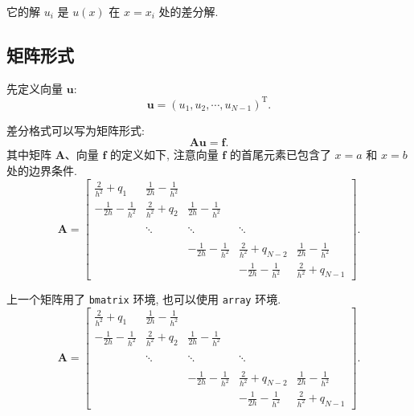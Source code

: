 它的解 $u_i$ 是 $u(x)$ 在 $x=x_i$ 处的差分解.


\subsection{矩阵形式}

先定义向量 $\boldsymbol{u}$:
\begin{equation*}
  \boldsymbol{u}=(u_{1}, u_{2}, \cdots, u_{N-1})^{\mathrm{T}}.
\end{equation*}

差分格式可以写为矩阵形式:
\begin{equation*}
  \boldsymbol{A}\boldsymbol{u}=\boldsymbol{f}.
\end{equation*}
其中矩阵 $\boldsymbol{A}$、向量 $\boldsymbol{f}$ 的定义如下, 注意向量 $\boldsymbol{f}$ 的首尾元素已包含了 $x=a$ 和 $x=b$ 处的边界条件.
\begin{equation}\label{eq:matrix1}
\boldsymbol{A}=\begin{bmatrix}
\frac{2}{h^{2}}+q_{1} & \frac{1}{2h}-\frac{1}{h^{2}} &   &  &  \\[8pt]
 -\frac{1}{2h}-\frac{1}{h^{2}} & \frac{2}{h^{2}}+q_{2} & \frac{1}{2h}-\frac{1}{h^{2}}  & &  \\[8pt]
  &  &  &  &    \\
  &  \ddots  & \ddots  &  \ddots  &  \\[8pt]
  &  &  &  &    \\
  &   & -\frac{1}{2h}-\frac{1}{h^{2}} & \frac{2}{h^{2}}+q_{N-2}& \frac{1}{2h}-\frac{1}{h^{2}} \\[8pt]
  &  &  & -\frac{1}{2h}-\frac{1}{h^{2}} & \frac{2}{h^{2}}+q_{N-1}
\end{bmatrix}.
\end{equation}

上一个矩阵用了 \verb|bmatrix| 环境, 也可以使用 \verb|array| 环境.
\begin{equation}\label{eq:matrix2}
\boldsymbol{A}=\left[\begin{array}{cccccc}
\frac{2}{h^{2}}+q_{1} & \frac{1}{2h}-\frac{1}{h^{2}} &  &  &  \\[8pt]
 -\frac{1}{2h}-\frac{1}{h^{2}} & \frac{2}{h^{2}}+q_{2} & \frac{1}{2h}-\frac{1}{h^{2}}  & &  \\[8pt]
  &  &  &  &   \\
  &  \ddots  & \ddots & \ddots &  \\[8pt]
  &  &  &  &   \\
  &   & -\frac{1}{2h}-\frac{1}{h^{2}} & \frac{2}{h^{2}}+q_{N-2} & \frac{1}{2h}-\frac{1}{h^{2}} \\[8pt]
  &  &  & -\frac{1}{2h}-\frac{1}{h^{2}} & \frac{2}{h^{2}}+q_{N-1}
\end{array}\right].
\end{equation}


